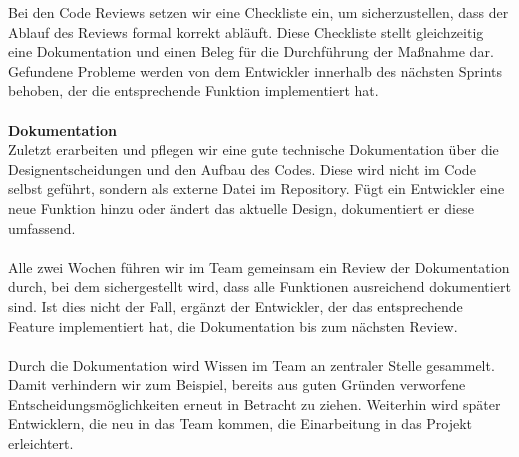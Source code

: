 \documentclass[accentcolor=tud0b,12pt,paper=a4]{tudreport}
\begin{document}
      Bei den Code Reviews setzen wir eine Checkliste ein, um sicherzustellen, dass der Ablauf des Reviews formal korrekt abläuft. Diese Checkliste stellt gleichzeitig eine Dokumentation und einen Beleg für die Durchführung der Maßnahme dar. Gefundene Probleme werden von dem Entwickler innerhalb des nächsten Sprints behoben, der die entsprechende Funktion implementiert hat.\\\\
      \textbf{Dokumentation}\\
      Zuletzt erarbeiten und pflegen wir eine gute technische Dokumentation über die Designentscheidungen und den Aufbau des Codes. Diese wird nicht im Code selbst geführt, sondern als externe Datei im Repository. Fügt ein Entwickler eine neue Funktion hinzu oder ändert das aktuelle Design, dokumentiert er diese umfassend.\\\\
      Alle zwei Wochen führen wir im Team gemeinsam ein Review der Dokumentation durch, bei dem sichergestellt wird, dass alle Funktionen ausreichend dokumentiert sind. Ist dies nicht der Fall, ergänzt der Entwickler, der das entsprechende Feature implementiert hat, die Dokumentation bis zum nächsten Review.\\\\
      Durch die Dokumentation wird Wissen im Team an zentraler Stelle gesammelt. Damit verhindern wir zum Beispiel, bereits aus guten Gründen verworfene Entscheidungsmöglichkeiten erneut in Betracht zu ziehen. Weiterhin wird später Entwicklern, die neu in das Team kommen, die Einarbeitung in das Projekt erleichtert.
\end{document}
